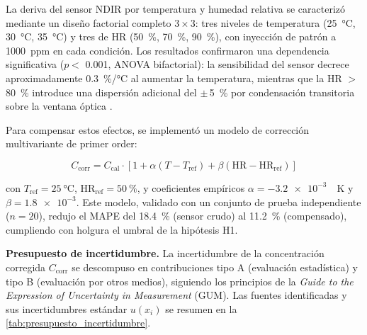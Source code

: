 La deriva del sensor NDIR por temperatura y humedad relativa se caracterizó mediante un diseño factorial completo $3 \times 3$: tres niveles de temperatura (\SI{25}{\celsius}, \SI{30}{\celsius}, \SI{35}{\celsius}) y tres de HR (\SI{50}{\percent}, \SI{70}{\percent}, \SI{90}{\percent}), con inyección de patrón  a \num{1000}~ppm en cada condición. Los resultados confirmaron una dependencia significativa ($p <$ \num{0.001}, ANOVA bifactorial): la sensibilidad del sensor decrece aproximadamente \SI{0.3}{\percent}/\si{\celsius} al aumentar la temperatura, mientras que la HR $>$ \SI{80}{\percent} introduce una dispersión adicional del $\pm$\,\SI{5}{\percent} por condensación transitoria sobre la ventana óptica \parencite{biagiDevelopmentMachineLearningbased2024a, herrinCollateralDataQualitya}.

Para compensar estos efectos, se implementó un modelo de corrección multivariante de primer order:

\begin{equation}
C_{\text{corr}} = C_{\text{cal}} \cdot \left[ 1 + \alpha (T - T_{\text{ref}}) + \beta (\text{HR} - \text{HR}_{\text{ref}}) \right]
\label{eq:compensacion_cruzada}
\end{equation}

con $T_{\text{ref}} = \SI{25}{\celsius}$, $\text{HR}_{\text{ref}} = \SI{50}{\percent}$, y coeficientes empíricos $\alpha = -\num{3.2e-3}$~\si{\per\kelvin} y $\beta = \num{1.8e-3}$. Este modelo, validado con un conjunto de prueba independiente ($n = 20$), redujo el MAPE del \SI{18.4}{\percent} (sensor crudo) al \SI{11.2}{\percent} (compensado), cumpliendo con holgura el umbral de la hipótesis H1.

\textbf{Presupuesto de incertidumbre.} La incertidumbre de la concentración corregida $C_{\text{corr}}$ se descompuso en contribuciones tipo A (evaluación estadística) y tipo B (evaluación por otros medios), siguiendo los principios de la \textit{Guide to the Expression of Uncertainty in Measurement} (GUM). Las fuentes identificadas y sus incertidumbres estándar $u(x_i)$ se resumen en la \cref{tab:presupuesto_incertidumbre}.

